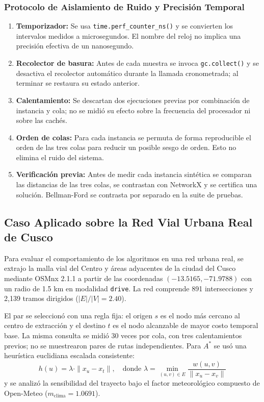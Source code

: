 \subsubsection{Protocolo de Aislamiento de Ruido y Precisión Temporal}
\begin{enumerate}
    \item \textbf{Temporizador:} Se usa \texttt{time.perf\_counter\_ns()} y se convierten los intervalos medidos a microsegundos. El nombre del reloj no implica una precisión efectiva de un nanosegundo.
    \item \textbf{Recolector de basura:} Antes de cada muestra se invoca \texttt{gc.collect()} y se desactiva el recolector automático durante la llamada cronometrada; al terminar se restaura su estado anterior.
    \item \textbf{Calentamiento:} Se descartan dos ejecuciones previas por combinación de instancia y cola; no se midió su efecto sobre la frecuencia del procesador ni sobre las cachés.
    \item \textbf{Orden de colas:} Para cada instancia se permuta de forma reproducible el orden de las tres colas para reducir un posible sesgo de orden. Esto no elimina el ruido del sistema.
    \item \textbf{Verificación previa:} Antes de medir cada instancia sintética se comparan las distancias de las tres colas, se contrastan con NetworkX y se certifica una solución. Bellman-Ford se contrasta por separado en la suite de pruebas.
\end{enumerate}

\subsection{Caso Aplicado sobre la Red Vial Urbana Real de Cusco}
Para evaluar el comportamiento de los algoritmos en una red urbana real, se extrajo la malla vial del Centro y áreas adyacentes de la ciudad del Cusco mediante OSMnx 2.1.1 a partir de las coordenadas $(-13.5165, -71.9788)$ con un radio de 1.5 km en modalidad \texttt{drive}. La red comprende 891 intersecciones y 2,139 tramos dirigidos ($|E|/|V| = 2.40$).

El par se seleccionó con una regla fija: el origen $s$ es el nodo más cercano al centro de extracción y el destino $t$ es el nodo alcanzable de mayor costo temporal base. La misma consulta se midió 30 veces por cola, con tres calentamientos previos; no se muestrearon pares de rutas independientes. Para $A^*$ se usó una heurística euclidiana escalada consistente:
\begin{equation}
    h(u) = \lambda \cdot \|x_u - x_t\|, \quad \text{donde } \lambda = \min_{(u, v) \in E} \frac{w(u, v)}{\|x_u - x_v\|}
    \label{eq:heuristica_escalada}
\end{equation}
y se analizó la sensibilidad del trayecto bajo el factor meteorológico compuesto de Open-Meteo ($m_{\text{clima}} = 1.0691$).


